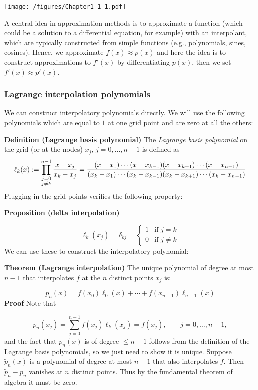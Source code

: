 \documentclass[12pt,landscape]{article}
\begin{document}
{\texttt{[image: /figures/Chapter1\_1\_1.pdf]}

A central idea in approximation methods is to approximate a function (which could be a solution to a differential equation, for example) with an interpolant, which are typically constructed from simple functions (e.g., polynomials, sines, cosines).  Hence, we approximate $f(x) \approx p(x)$ and here the idea is to  construct approximations to $f'(x)$ by differentiating $p(x)$, then we set $f'(x) \approx p'(x)$.
\newpage
\subsubsection{Lagrange interpolation polynomials}
We can construct interpolatory polynomials directly. We will use the following polynomials which are equal to $1$ at one grid point and are zero at all the others:

\textbf{Definition (Lagrange basis polynomial)} The \emph{Lagrange basis polynomial} on the grid (or at the nodes)  $x_{j}$, $j = 0, \ldots, n-1$  is defined as
{\LARGE
\[
\ensuremath{\ell}_k(x) := \prod_{\substack{j = 0 \\ j \neq k}}^{n-1} {x-x_j \over x_k - x_j} =  {(x-x_1) \ensuremath{\cdots}(x-x_{k-1})(x-x_{k+1}) \ensuremath{\cdots} (x-x_{n-1}) \over (x_k - x_1) \ensuremath{\cdots} (x_k - x_{k-1}) (x_k - x_{k+1}) \ensuremath{\cdots} (x_k - x_{n-1})}
\]}
Plugging in the grid points verifies the following property:

\textbf{Proposition (delta interpolation)}

\[
\ensuremath{\ell}_k(x_j) = \ensuremath{\delta}_{kj} = \begin{cases}
1 & \text{if } j = k \\
0 & \text{if } j \neq k
\end{cases}
\]
We can use these to construct the interpolatory polynomial:
\newpage

\textbf{Theorem (Lagrange interpolation)} The unique  polynomial of degree at most $n-1$ that interpolates $f$ at the $n$ distinct points $x_j$ is:

\[
p_n(x) = f(x_0) \ensuremath{\ell}_0(x) + \ensuremath{\cdots} + f(x_{n-1}) \ensuremath{\ell}_{n-1}(x)
\]
\textbf{Proof} Note that

\[
p_n(x_j) = \sum_{j=0}^{n-1} f(x_j) \ensuremath{\ell}_k(x_j) = f(x_j), \qquad j = 0, \ldots, n-1,
\]
and the fact that $p_n(x)$ is of degree $\leq n-1$ follows from the definition of the Lagrange basis polynomials, so we just need to show it is unique. Suppose $\tilde{p}_n(x)$ is a  polynomial of degree at most $n-1$ that also interpolates $f$. Then $\tilde{p}_n - p_n$ vanishes at $n$ distinct points. Thus by the fundamental theorem of algebra it must be zero.

}
\end{document}
